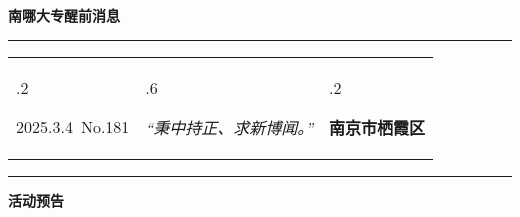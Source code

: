 \documentclass[letterpaper, 12pt]{article}
\begin{document}
\begin{center}
    \Huge\textbf{南哪大专醒前消息}
\end{center}
\vspace{4mm}
\hrule
\renewcommand\tabularxcolumn[1]{m{#1}}
\begin{tabularx}{\textwidth}{>{\hsize.2\hsize}X>{\hsize.6\hsize}X>{\hsize.2\hsize}X}
    \begin{flushleft}
        2025.3.4\, No.181
    \end{flushleft}
    &
    \begin{center}
        \textit{“秉中持正、求新博闻。”}
    \end{center}
    &
    \begin{flushright}
        \textbf{南京市栖霞区}
    \end{flushright}
\end{tabularx}
\vspace{-3.5mm}
\hrule
\vspace{4mm}
\centerline{\huge\textbf{活动预告}}
\end{document}
